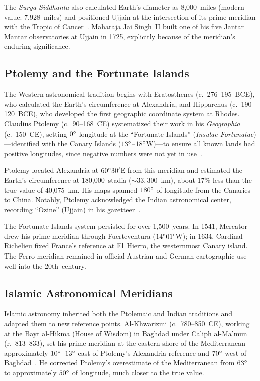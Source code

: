 \documentclass[10pt,a4paper]{article}
\begin{document}
The \textit{Surya Siddhanta} also calculated Earth's diameter as 8,000~miles
(modern value: 7,928~miles) and positioned Ujjain at the intersection of
its prime meridian with the Tropic of Cancer~\cite{burgess1860}. Maharaja
Jai Singh~II built one of his five Jantar Mantar observatories at Ujjain
in 1725, explicitly because of the meridian's enduring significance.

\subsection{Ptolemy and the Fortunate Islands}
\label{subsec:ptolemy}

The Western astronomical tradition begins with Eratosthenes (c.~276--195~BCE),
who calculated the Earth's circumference at Alexandria, and Hipparchus
(c.~190--120~BCE), who developed the first geographic coordinate system at
Rhodes. Claudius Ptolemy (c.~90--168~CE) systematized their work in his
\textit{Geographia} (c.~150~CE), setting $0\degree$ longitude at the
``Fortunate Islands'' (\textit{Insulae Fortunatae})---identified with the
Canary Islands ($13\degree$--$18\degree$W)---to ensure all known lands had
positive longitudes, since negative numbers were not yet in
use~\cite{berggren2000}.

Ptolemy located Alexandria at $60\degree 30'$E from this meridian and
estimated the Earth's circumference at 180,000~stadia (${\sim}33{,}300$~km),
about 17\% less than the true value of 40,075~km. His maps spanned
$180\degree$ of longitude from the Canaries to China. Notably, Ptolemy
acknowledged the Indian astronomical center, recording ``Ozine'' (Ujjain) in
his gazetteer~\cite{berggren2000}.

The Fortunate Islands system persisted for over 1,500~years. In 1541,
Mercator drew his prime meridian through Fuerteventura ($14\degree 01'$W);
in 1634, Cardinal Richelieu fixed France's reference at El~Hierro, the
westernmost Canary island. The Ferro meridian remained in official Austrian
and German cartographic use well into the 20th~century.

\subsection{Islamic Astronomical Meridians}
\label{subsec:islamic}

Islamic astronomy inherited both the Ptolemaic and Indian traditions and
adapted them to new reference points. Al-Khwarizmi (c.~780--850~CE),
working at the Bayt al-Hikma (House of Wisdom) in Baghdad under Caliph
al-Ma'mun (r.~813--833), set his prime meridian at the eastern shore of
the Mediterranean---approximately $10\degree$--$13\degree$ east of
Ptolemy's Alexandria reference and $70\degree$ west of
Baghdad~\cite{kennedy1956}. He corrected Ptolemy's overestimate of the
Mediterranean from $63\degree$ to approximately $50\degree$ of longitude,
much closer to the true value.
\end{document}
